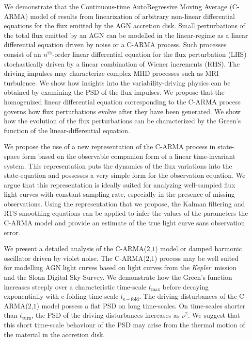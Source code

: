 \documentclass[a4paper,fleqn,usenatbib]{mnras}
\newcommand{\Kepler}{\textit{Kepler~}}
\begin{document}
We demonstrate that the Continuous-time AutoRegressive Moving Average (C-ARMA) model of \citet{Kelly14} results from linearization of arbitrary non-linear differential equations for the flux emitted by the AGN accretion disk. Small perturbations of the total flux emitted by an AGN can be modelled in the linear-regime as a linear differential equation driven by noise or a C-ARMA process. Such processes consist of an $n^{\mathrm{th}}$-order linear differential equation for the flux perturbation (LHS) stochastically driven by a linear combination of Wiener increments (RHS). The driving impulses may characterize complex MHD processes such as MRI turbulence. We show how insights into the variability-driving physics can be obtained by examining the PSD of the flux impulses. We propose that the homogenized linear differential equation corresponding to the C-ARMA process governs how flux perturbations evolve after they have been generated. We show how the evolution of the flux perturbations can be characterized by the Green's function of the linear-differential equation.

We propose the use of a new representation of the C-ARMA process in state-space form based on the observable companion form of a linear time-invariant system. This representation puts the dynamics of the flux variations into the state-equation and possesses a very simple form for the observation equation. We argue that this representation is ideally suited for analyzing well-sampled flux light curves with constant sampling rate, especially in the presence of missing observations. Using the representation that we propose, the Kalman filtering and RTS smoothing equations can be applied to infer the values of the parameters the C-ARMA model and provide an estimate of the true light curve sans observation error. 

We present a detailed analysis of the C-ARMA($2$,$1$) model or damped harmonic oscillator driven by violet noise. The C-ARMA($2$,$1$) process may be well suited for modelling AGN light curves based on light curves from the \Kepler mission and the Sloan Digital Sky Survey. We demonstrate how the Green's function increases steeply over a characteristic time-scale $t_{\mathrm{max}}$ before decaying exponentially with e-folding time-scale $t_{\mathrm{e-fold}}$. The driving disturbances of the C-ARMA($2$,$1$) model possess a flat PSD on long time-scales. On time-scales shorter than $t_{\mathrm{turn}}$, the PSD of the driving disturbances increases as $\nu^{2}$. We suggest that this short time-scale behaviour of the PSD may arise from the thermal motion of the material in the accretion disk.
\end{document}
